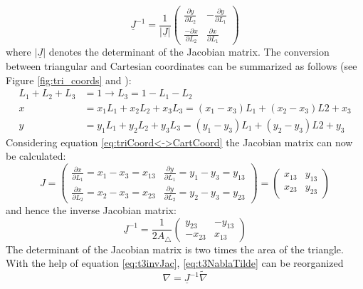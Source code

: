   \begin{equation}
  \underline{J}^{-1} = \frac{1}{|\underline{J}|} \begin{pmatrix}
  \frac{\partial y}{\partial L_2} & -\frac{\partial y}{\partial L_1} \\
  \frac{-\partial x}{\partial L_2} & \frac{\partial x}{\partial L_1}
  \end{pmatrix}
  \end{equation}
  where $|\underline{J}|$ denotes the determinant of the Jacobian matrix. The conversion between triangular and Cartesian coordinates can be summarized as follows (see Figure \ref{fig:tri_coords} and \cite{steinke2005finite}):
  \begin{align}\label{eq:triCoord<->CartCoord}
  L_1 + L_2 + L_3 &= 1 \rightarrow L_3 = 1-L_1-L_2 \nonumber\\
  x &= x_1L_1 + x_2L_2 + x_3L_3 = (x_1-x_3)L_1 + (x_2-x_3)L2 + x_3\\
  y &= y_1L_1 + y_2L_2 + y_3L_3 = (y_1-y_3)L_1 + (y_2-y_3)L2 + y_3 \nonumber
  \end{align}
  Considering equation \eqref{eq:triCoord<->CartCoord} the Jacobian matrix can now be calculated:
  \begin{equation}
  J = \begin{pmatrix}
  \frac{\partial x}{\partial L_1} = x_1-x_3 = x_{13} & \frac{\partial y}{\partial L_1} = y_1-y_3 = y_{13}\\
  \frac{\partial x}{\partial L_2} = x_2-x_3 = x_{23} & \frac{\partial y}{\partial L_2} = y_2-y_3 = y_{23}
  \end{pmatrix} = \begin{pmatrix}
  x_{13} & y_{13}\\
  x_{23} & y_{23}
  \end{pmatrix}
  \end{equation}
  and hence the inverse Jacobian matrix:
  \begin{equation}\label{eq:t3invJac}
  \underline{J}^{-1} = \frac{1}{2 A_\triangle} \begin{pmatrix}
  y_{23} & -y_{13}\\
  -x_{23} & x_{13}
  \end{pmatrix}
  \end{equation}
  The determinant of the Jacobian matrix is two times the area of the triangle. With the help of equation \eqref{eq:t3invJac}, \eqref{eq:t3NablaTilde} can be reorganized
  \begin{equation}\label{eq:nabla=invJ*nabla-tilde}
  \nabla = \underline{J}^{-1} \tilde{\nabla}
  \end{equation}
